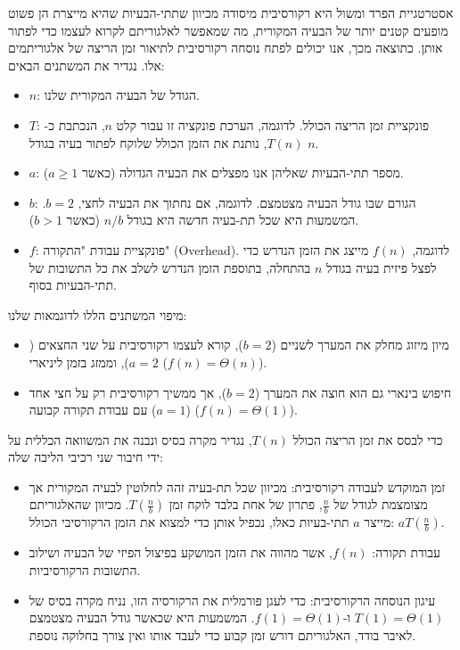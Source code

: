 \documentclass[11pt, a4paper]{article}
\begin{document}
אסטרטגיית הפרד ומשול היא רקורסיבית מיסודה מכיוון שתתי-הבעיות שהיא מייצרת הן פשוט מופעים קטנים יותר של הבעיה המקורית, מה שמאפשר לאלגוריתם לקרוא לעצמו כדי לפתור אותן. כתוצאה מכך, אנו יכולים לפתח נוסחה רקורסיבית לתיאור זמן הריצה של אלגוריתמים אלו. נגדיר את המשתנים הבאים:
\begin{itemize}
    \item $n$: הגודל של הבעיה המקורית שלנו.
    \item $T$: פונקציית זמן הריצה הכולל. לדוגמה, הערכת פונקציה זו עבור קלט $n$, הנכתבת כ-$T(n)$, נותנת את הזמן הכולל שלוקח לפתור בעיה בגודל $n$.
    \item $a$: מספר תתי-הבעיות שאליהן אנו מפצלים את הבעיה הגדולה (כאשר $a \ge 1$).
    \item $b$: הגורם שבו גודל הבעיה מצטמצם. לדוגמה, אם נחתוך את הבעיה לחצי, $b = 2$. המשמעות היא שכל תת-בעיה חדשה היא בגודל $n/b$ (כאשר $b > 1$).
    \item $f$: פונקציית עבודת "התקורה" (\textenglish{Overhead}). לדוגמה, $f(n)$ מייצג את הזמן הנדרש כדי לפצל פיזית בעיה בגודל $n$ בהתחלה, בתוספת הזמן הנדרש לשלב את כל התשובות של תתי-הבעיות בסוף.
\end{itemize}
\newpage
מיפוי המשתנים הללו לדוגמאות שלנו:
\begin{itemize}
    \item מיון מיזוג מחלק את המערך לשניים ($b=2$), קורא לעצמו רקורסיבית על שני החצאים ($a=2$), וממזג בזמן ליניארי ($f(n) = \Theta(n)$).

    \item חיפוש בינארי גם הוא חוצה את המערך ($b=2$), אך ממשיך רקורסיבית רק על חצי אחד ($a=1$) עם עבודת תקורה קבועה ($f(n) = \Theta(1)$).
\end{itemize}


כדי לבסס את זמן הריצה הכולל $T(n)$, נגדיר מקרה בסיס ונבנה את המשוואה הכללית על ידי חיבור שני רכיבי הליבה שלה:

\begin{itemize}
    \item זמן המוקדש לעבודה רקורסיבית: מכיוון שכל תת-בעיה זהה לחלוטין לבעיה המקורית אך מצומצמת לגודל של $\frac{n}{b}$, פתרון של אחת בלבד לוקח זמן $T\left(\frac{n}{b}\right)$. מכיוון שהאלגוריתם מייצר $a$ תתי-בעיות כאלו, נכפיל אותן כדי למצוא את הזמן הרקורסיבי הכולל: $aT\left(\frac{n}{b}\right)$.

    \item עבודת תקורה: $f(n)$, אשר מהווה את הזמן המושקע בפיצול הפיזי של הבעיה ושילוב התשובות הרקורסיביות.

    \item עיגון הנוסחה הרקורסיבית: כדי לעגן פורמלית את הרקורסיה הזו, נניח מקרה בסיס של $T(1) = \Theta(1)$ ו-$f(1) = \Theta(1)$. המשמעות היא שכאשר גודל הבעיה מצטמצם לאיבר בודד, האלגוריתם דורש זמן קבוע כדי לעבד אותו ואין צורך בחלוקה נוספת.
\end{itemize}
\end{document}
